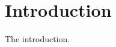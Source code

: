 \documentclass[../PhD.tex]{subfiles}
\begin{document}

\chapter{Introduction}
\label{ch: intro}

The introduction.
\end{document}
